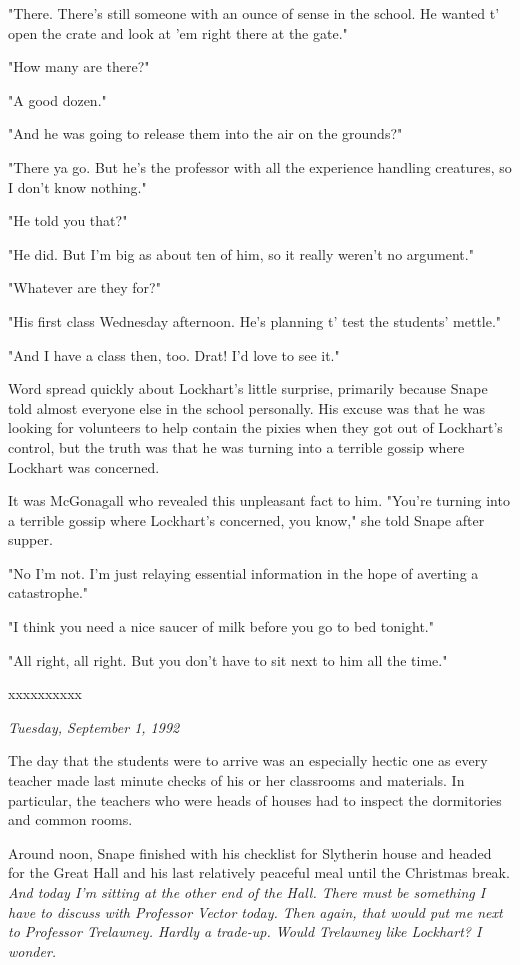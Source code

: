\documentclass[a4paper,11pt]{article}
\begin{document}
"There. There's still someone with an ounce of sense in the school. He wanted t' open the crate and look at 'em right there at the gate."

"How many are there?"

"A good dozen."

"And he was going to release them into the air on the grounds?"

"There ya go. But he's the professor with all the experience handling creatures, so I don't know nothing."

"He told you that?"

"He did. But I'm big as about ten of him, so it really weren't no argument."

"Whatever are they for?"

"His first class Wednesday afternoon. He's planning t' test the students' mettle."

"And I have a class then, too. Drat! I'd love to see it."

Word spread quickly about Lockhart's little surprise, primarily because Snape told almost everyone else in the school personally. His excuse was that he was looking for volunteers to help contain the pixies when they got out of Lockhart's control, but the truth was that he was turning into a terrible gossip where Lockhart was concerned.

It was McGonagall who revealed this unpleasant fact to him. "You're turning into a terrible gossip where Lockhart's concerned, you know," she told Snape after supper.

"No I'm not. I'm just relaying essential information in the hope of averting a catastrophe."

"I think you need a nice saucer of milk before you go to bed tonight."

"All right, all right. But you don't have to sit next to him all the time."

xxxxxxxxxx

\emph{Tuesday, September 1, 1992}

The day that the students were to arrive was an especially hectic one as every teacher made last minute checks of his or her classrooms and materials. In particular, the teachers who were heads of houses had to inspect the dormitories and common rooms.

Around noon, Snape finished with his checklist for Slytherin house and headed for the Great Hall and his last relatively peaceful meal until the Christmas break. \emph{And today I'm sitting at the other end of the Hall. There must be something I have to discuss with Professor Vector today. Then again, that would put me next to Professor Trelawney. Hardly a trade-up. Would Trelawney like Lockhart? I wonder.}
\end{document}
